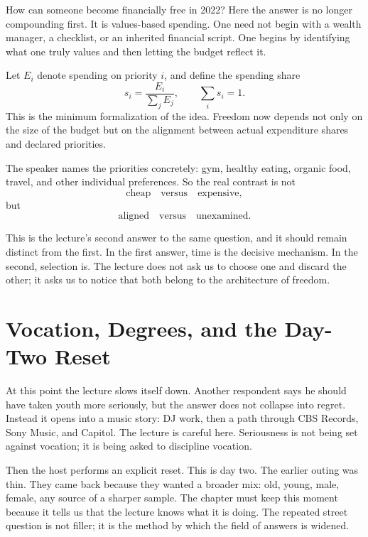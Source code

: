 How can someone become financially free in 2022? Here the answer is no longer compounding first. It is values-based spending. One need not begin with a wealth manager, a checklist, or an inherited financial script. One begins by identifying what one truly values and then letting the budget reflect it.

Let \(E_i\) denote spending on priority \(i\), and define the spending share
\begin{equation}
s_i = \frac{E_i}{\sum_j E_j},
\qquad
\sum_i s_i = 1.
\end{equation}
This is the minimum formalization of the idea. Freedom now depends not only on the size of the budget but on the alignment between actual expenditure shares and declared priorities.

The speaker names the priorities concretely: gym, healthy eating, organic food, travel, and other individual preferences. So the real contrast is not
\[
\text{cheap} \quad \text{versus} \quad \text{expensive},
\]
but
\[
\text{aligned} \quad \text{versus} \quad \text{unexamined}.
\]

This is the lecture's second answer to the same question, and it should remain distinct from the first. In the first answer, time is the decisive mechanism. In the second, selection is. The lecture does not ask us to choose one and discard the other; it asks us to notice that both belong to the architecture of freedom.

\section{Vocation, Degrees, and the Day-Two Reset}

At this point the lecture slows itself down. Another respondent says he should have taken youth more seriously, but the answer does not collapse into regret. Instead it opens into a music story: DJ work, then a path through CBS Records, Sony Music, and Capitol. The lecture is careful here. Seriousness is not being set against vocation; it is being asked to discipline vocation.

Then the host performs an explicit reset. This is day two. The earlier outing was thin. They came back because they wanted a broader mix: old, young, male, female, any source of a sharper sample. The chapter must keep this moment because it tells us that the lecture knows what it is doing. The repeated street question is not filler; it is the method by which the field of answers is widened.


